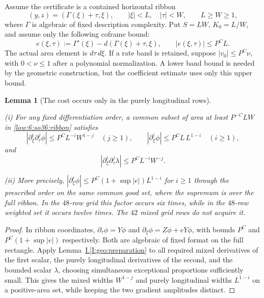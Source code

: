 \documentclass[11pt]{amsart}
\newtheorem{lemma}[theorem]{Lemma}
\theoremstyle{definition}
\theoremstyle{remark}
\numberwithin{equation}{section}
\newcommand{\partIref}[1]{\hyperref[I:#1]{I.\ref*{I:#1}}}
\begin{document}
Assume the certificate is a contained horizontal ribbon
\begin{equation}\label{low:6:so36:ribbon}
(y,z)=(\Gamma(\xi)+\tau,\xi),\qquad |\xi|<L,\quad |\tau|<W,\qquad L\ge W\ge1,
\end{equation}
where $\Gamma$ is algebraic of fixed description complexity. Put $S=LW$, $K_0=L/W$, and assume only the following coframe bound:
\begin{equation}\label{low:6:so36:defect}
e(\xi,\tau):=\Gamma'(\xi)-d(\Gamma(\xi)+\tau,\xi),\qquad |e(\xi,\tau)|\le P^CL.
\end{equation}
The actual area element is $d\tau\,d\xi$. If a rate band is retained, suppose $|v_0|\le P^C\nu$, with $0<\nu\le1$ after a polynomial normalization. A lower band bound is needed by the geometric construction, but the coefficient estimate uses only this upper bound.

\begin{lemma}[The cost occurs only in the purely longitudinal rows]\label{low:6:so36:scalar-widths}

\noindent\textup{(i)} For any fixed differentiation order, a common subset of area at least $P^{-C}LW$ in \eqref{low:6:so36:ribbon} satisfies
\[
|\partial_\xi^i\partial_\tau^j\phi|\le P^C L^{-i}W^{1-j}\quad(j\ge1),\qquad |\partial_\xi^i\phi|\le P^C L\,L^{1-i}\quad(i\ge1),
\]
and
\[
|\partial_\xi^i\partial_\tau^j\lambda|\le P^CL^{-i}W^{-j}.
\]

\noindent\textup{(ii)} More precisely, $|\partial_\xi^i\phi|\le P^C(1+\sup|e|)L^{1-i}$ for $i\ge1$ through the prescribed order on the same common good set, where the supremum is over the full ribbon. In the $48$-row grid this factor occurs six times, while in the $48$-row weighted set it occurs twelve times. The $42$ mixed grid rows do not acquire it.
\end{lemma}
\begin{proof}
In ribbon coordinates, $\partial_\tau\phi=Y\phi$ and $\partial_\xi\phi=Z\phi+eY\phi$, with bounds $P^C$ and $P^C(1+\sup|e|)$ respectively. Both are algebraic of fixed format on the full rectangle. Apply Lemma~\partIref{geo:preparation} to all required mixed derivatives of the first scalar, the purely longitudinal derivatives of the second, and the bounded scalar $\lambda$, choosing simultaneous exceptional proportions sufficiently small. This gives the mixed widths $W^{1-j}$ and purely longitudinal widths $L^{1-i}$ on a positive-area set, while keeping the two gradient amplitudes distinct.
\end{proof}
\end{document}
